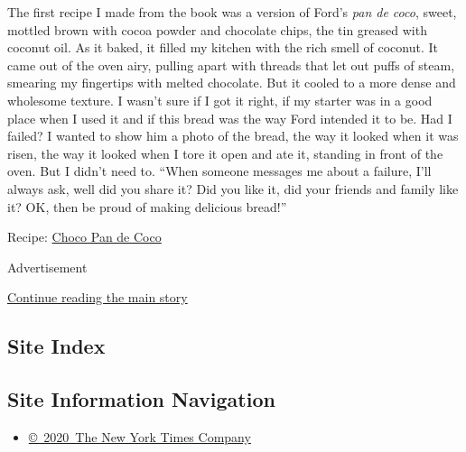 The first recipe I made from the book was a version of Ford's \emph{pan
de coco}, sweet, mottled brown with cocoa powder and chocolate chips,
the tin greased with coconut oil. As it baked, it filled my kitchen with
the rich smell of coconut. It came out of the oven airy, pulling apart
with threads that let out puffs of steam, smearing my fingertips with
melted chocolate. But it cooled to a more dense and wholesome texture. I
wasn't sure if I got it right, if my starter was in a good place when I
used it and if this bread was the way Ford intended it to be. Had I
failed? I wanted to show him a photo of the bread, the way it looked
when it was risen, the way it looked when I tore it open and ate it,
standing in front of the oven. But I didn't need to. ``When someone
messages me about a failure, I'll always ask, well did you share it? Did
you like it, did your friends and family like it? OK, then be proud of
making delicious bread!''

Recipe:
\href{https://cooking.nytimes.com/recipes/1021315-choco-pan-de-coco}{Choco
Pan de Coco}

Advertisement

\protect\hyperlink{after-bottom}{Continue reading the main story}

\hypertarget{site-index}{%
\subsection{Site Index}\label{site-index}}

\hypertarget{site-information-navigation}{%
\subsection{Site Information
Navigation}\label{site-information-navigation}}

\begin{itemize}
\tightlist
\item
  \href{https://help.nytimes.com/hc/en-us/articles/115014792127-Copyright-notice}{©~2020~The
  New York Times Company}
\end{itemize}

